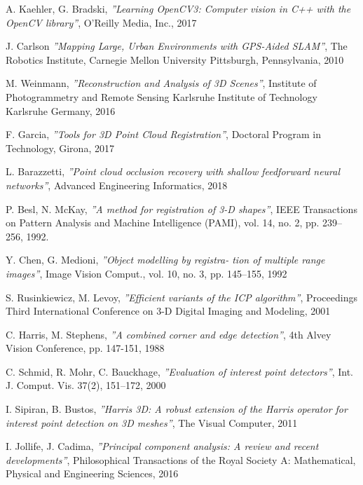 \begin{thebibliography}{9}
    A. Kaehler, G. Bradski,
    \textit{''Learning OpenCV3: Computer vision in C++ with the OpenCV library''},
    O'Reilly Media, Inc.,
    2017
    
    J. Carlson
    \textit{''Mapping Large, Urban Environments with GPS-Aided SLAM''},
    The Robotics Institute, Carnegie Mellon University Pittsburgh, Pennsylvania,
    2010
    
    M. Weinmann,
    \textit{''Reconstruction and Analysis of 3D Scenes''},
    Institute of Photogrammetry and Remote Sensing Karlsruhe Institute of Technology Karlsruhe Germany,
    2016
    
    F. Garcia,
    \textit{''Tools for 3D Point Cloud Registration''},
    Doctoral Program in Technology, Girona,
    2017
    
    L. Barazzetti,
    \textit{''Point cloud occlusion recovery with shallow feedforward neural networks''},
    Advanced Engineering Informatics,
    2018
    
    P. Besl, N. McKay,
    \textit{''A method for registration of 3-D shapes''},
    IEEE Transactions on Pattern Analysis and Machine Intelligence (PAMI), vol. 14, no. 2, pp. 239– 256, 
    1992.
    
    Y. Chen, G. Medioni,
    \textit{''Object modelling by registra- tion of multiple range images''},
    Image Vision Comput., vol. 10, no. 3, pp. 145–155,
    1992
    
    S. Rusinkiewicz, M. Levoy,
    \textit{''Efficient variants of the ICP algorithm''},
    Proceedings Third International Conference on 3-D Digital Imaging and Modeling,
    2001
    
    C. Harris, M. Stephens,
    \textit{''A combined corner and edge detection''},
    4th Alvey Vision Conference, pp. 147-151,
    1988
    
    C. Schmid, R. Mohr, C. Bauckhage,
    \textit{''Evaluation of interest point detectors''},
    Int. J. Comput. Vis. 37(2), 151–172,
    2000
    
    I. Sipiran, B. Bustos,
    \textit{''Harris 3D: A robust extension of the Harris operator for interest point detection on 3D meshes''},
    The Visual Computer,
    2011
    
    I. Jollife, J. Cadima,
    \textit{''Principal component analysis: A review and recent developments''},
    Philosophical Transactions of the Royal Society A: Mathematical, Physical and Engineering Sciences,
    2016
    

\end{thebibliography}
